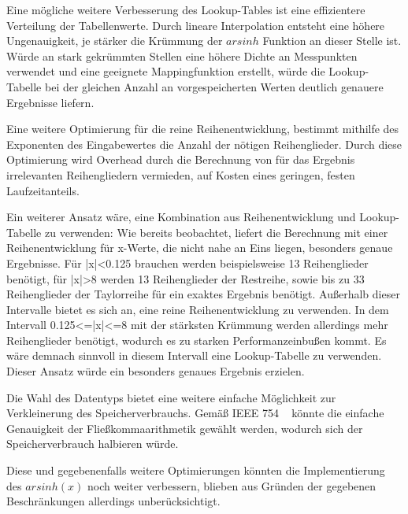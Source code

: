 \documentclass[course=erap] {aspdoc}
\begin{document}
    Eine mögliche weitere Verbesserung des Lookup-Tables ist eine effizientere Verteilung der Tabellenwerte.
    Durch lineare Interpolation entsteht eine höhere Ungenauigkeit, je stärker die Krümmung der $arsinh$ Funktion an dieser Stelle ist.
    Würde an stark gekrümmten Stellen eine höhere Dichte an Messpunkten verwendet und eine geeignete Mappingfunktion erstellt, würde die Lookup-Tabelle bei der gleichen Anzahl an vorgespeicherten Werten deutlich genauere Ergebnisse liefern.

    Eine weitere Optimierung für die reine Reihenentwicklung, bestimmt mithilfe des Exponenten des Eingabewertes die Anzahl der nötigen Reihenglieder.
    Durch diese Optimierung wird Overhead durch die Berechnung von für das Ergebnis irrelevanten Reihengliedern vermieden, auf Kosten eines geringen, festen Laufzeitanteils.

    Ein weiterer Ansatz wäre, eine Kombination aus Reihenentwicklung und Lookup-Tabelle zu verwenden:
    Wie bereits beobachtet, liefert die Berechnung mit einer Reihenentwicklung für x-Werte, die nicht nahe an Eins liegen, besonders genaue Ergebnisse.
    Für |x|<0.125 brauchen werden beispielsweise 13 Reihenglieder benötigt, für |x|>8 werden 13 Reihenglieder der Restreihe, sowie bis zu 33 Reihenglieder der Taylorreihe für ein exaktes Ergebnis benötigt.
    Außerhalb dieser Intervalle bietet es sich an, eine reine Reihenentwicklung zu verwenden.
    In dem Intervall 0.125<=|x|<=8 mit der stärksten Krümmung werden allerdings mehr Reihenglieder benötigt, wodurch es zu starken Performanzeinbußen kommt.
    Es wäre demnach sinnvoll in diesem Intervall eine Lookup-Tabelle zu verwenden.
    Dieser Ansatz würde ein besonders genaues Ergebnis erzielen.

    Die Wahl des Datentyps bietet eine weitere einfache Möglichkeit zur Verkleinerung des Speicherverbrauchs.
    Gemäß IEEE 754 ~\cite{StandardforBinaryFloating} könnte die einfache Genauigkeit der Fließkommaarithmetik gewählt werden, wodurch sich der Speicherverbrauch halbieren würde.

    Diese und gegebenenfalls weitere Optimierungen könnten die Implementierung des $arsinh(x)$ noch weiter verbessern, blieben aus Gründen der gegebenen Beschränkungen allerdings unberücksichtigt.

    
    
\end{document}
